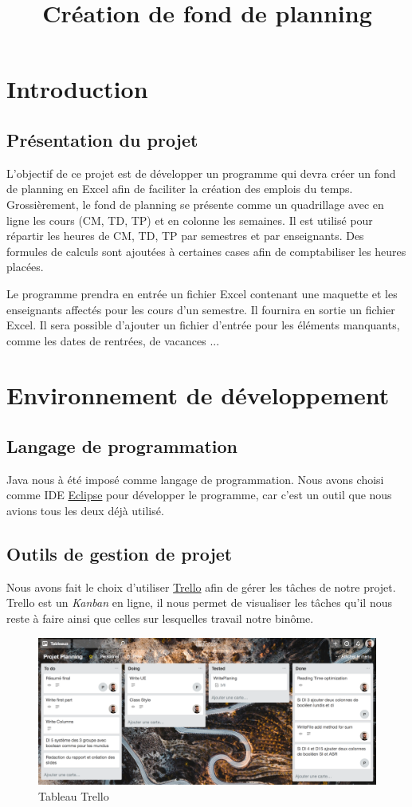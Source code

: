 \documentclass{polytech/polytech}
\title{Création de fond de planning}
\begin{document}
	\chapter{Introduction}
	\section{Présentation du projet}
	L'objectif de ce projet est de développer un programme qui devra créer un fond de planning en Excel afin de faciliter la création des emplois du temps.
	Grossièrement, le fond de planning se présente comme un quadrillage avec en ligne les cours (CM, TD, TP) et en colonne les semaines.
	Il est utilisé pour répartir les heures de CM, TD, TP par semestres et par enseignants.
	Des formules de calculs sont ajoutées à certaines cases afin de comptabiliser les heures placées.
	
	Le programme prendra en entrée un fichier Excel contenant une maquette et les enseignants affectés pour les cours d'un semestre.
	Il fournira en sortie un fichier Excel. Il sera possible d'ajouter un fichier d'entrée pour les éléments manquants, comme les dates de rentrées, de vacances ...

	\chapter{Environnement de développement}
	\section{Langage de programmation}

	Java nous à été imposé comme langage de programmation.
	Nous avons choisi comme IDE \href{http://www.eclipse.org}{Eclipse} pour développer le programme, car c'est un outil que nous avions tous les deux déjà utilisé.

	\section{Outils de gestion de projet}

	Nous avons fait le choix d'utiliser \href{https://trello.com/}{Trello} afin de gérer les tâches de notre projet.
	Trello est un \textit{Kanban} en ligne, il nous permet de visualiser les tâches qu'il nous reste à faire ainsi que celles sur lesquelles travail notre binôme.

	\begin{figure}
		\caption{Tableau Trello}
		\includegraphics[width=\textwidth]{./img/trello.png}
	\end{figure}
\end{document}
